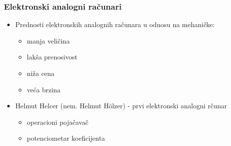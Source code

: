 \documentclass[14pt]{beamer}
\begin{document}
\begin{frame}[fragile]\frametitle{Elektronski analogni računari}
	\begin{itemize}
		\item Prednosti elektronskih analognih računara u odnosu na mehaničke:
		\begin{itemize}
			\item manja veličina
			\item lakša prenosivost
			\item niža cena
			\item  veća brzina
		\end{itemize}
	\end{itemize}
\begin{itemize}
	\item Helmut Helcer (nem. Helmut Hölzer) - prvi elektronski analogni rčunar
	\begin{itemize}
		\item operacioni pojačavač
		\item potenciometar koeficijenta
	\end{itemize}
\end{itemize}
\end{frame}
\end{document}
